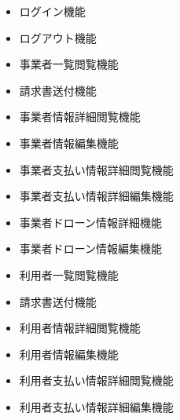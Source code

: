 \documentclass[a4paper, titlepage]{jsarticle}
\begin{document}
\begin{itemize}[labelwidth=\linewidth]
  \setlength{\leftskip}{1em}

  \item ログイン機能 %
  \item ログアウト機能 %

  \item 事業者一覧閲覧機能 %
  \item 請求書送付機能 %
  \item 事業者情報詳細閲覧機能 %
  \item 事業者情報編集機能 %
  \item 事業者支払い情報詳細閲覧機能 %
  \item 事業者支払い情報詳細編集機能 %
  \item 事業者ドローン情報詳細機能 %
  \item 事業者ドローン情報編集機能 %

  \item 利用者一覧閲覧機能 %
  \item 請求書送付機能 %
  \item 利用者情報詳細閲覧機能 %
  \item 利用者情報編集機能 %
  \item 利用者支払い情報詳細閲覧機能 %
  \item 利用者支払い情報詳細編集機能 %
  

\end{itemize}
\end{document}
